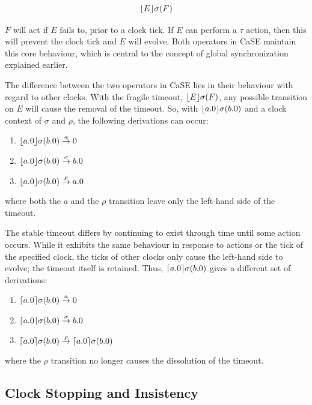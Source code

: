 \begin{equation}
\lfloor{E}\rfloor {\sigma} ({F})
\end{equation}

\noindent $F$ will act if $E$ fails to, prior to a clock tick.  If $E$
can perform a $\tau$ action, then this will prevent the clock tick and
$E$ will evolve. Both operators in CaSE maintain this core behaviour,
which is central to the concept of global synchronization explained
earlier.

The difference between the two operators in CaSE lies in their
behaviour with regard to other clocks.  With the fragile timeout,
$\lfloor{E}\rfloor {\sigma} ({F})$, any possible transition on $E$ will cause the
removal of the timeout.  So, with $\lfloor{a.0}\rfloor {\sigma} ({b.0})$ and a clock
context of $\sigma$ and $\rho$, the following derivations can occur:

\begin{enumerate}
\item $\lfloor{a.0}\rfloor {\sigma} ({b.0}) \stackrel{a}{\rightarrow} 0$
\item $\lfloor{a.0}\rfloor {\sigma} ({b.0}) \stackrel{\sigma}{\rightarrow} b.0$
\item $\lfloor{a.0}\rfloor {\sigma} ({b.0}) \stackrel{\rho}{\rightarrow} a.0$
\end{enumerate}

\noindent where both the $a$ and the $\rho$ transition leave only the
left-hand side of the timeout.

The stable timeout differs by continuing to exist through time until
some action occurs.  While it exhibits the same behaviour in response
to actions or the tick of the specified clock, the ticks of other
clocks only cause the left-hand side to evolve; the timeout itself is
retained.  Thus, $\lceil{a.0}\rceil {\sigma} ({b.0})$ gives a different set
of derivations:

\begin{enumerate}
\item $\lceil{a.0}\rceil {\sigma} ({b.0}) \stackrel{a}{\rightarrow} 0$
\item $\lceil{a.0}\rceil {\sigma} ({b.0}) \stackrel{\sigma}{\rightarrow} b.0$
\item $\lceil{a.0}\rceil {\sigma} ({b.0}) \stackrel{\rho}{\rightarrow} \lceil{a.0}\rceil {\sigma} ({b.0})$
\end{enumerate}

\noindent where the $\rho$ transition no longer causes the dissolution
of the timeout.

\subsection{Clock Stopping and Insistency}
\label{clockcontrol}

